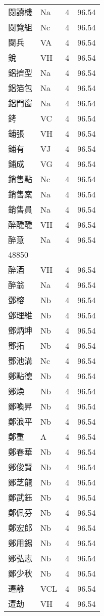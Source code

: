\documentclass[twocolumn]{book}
\begin{document}
\begin{supertabular}{llrr}
閱讀機 & Na & 4 &  96.54\\
閱覽組 & Nc & 4 &  96.54\\
閱兵 & VA & 4 &  96.54\\
銳 & VH & 4 &  96.54\\
鋁擠型 & Na & 4 &  96.54\\
鋁箔包 & Na & 4 &  96.54\\
鋁門窗 & Na & 4 &  96.54\\
銬 & VC & 4 &  96.54\\
鋪張 & VH & 4 &  96.54\\
鋪有 & VJ & 4 &  96.54\\
鋪成 & VG & 4 &  96.54\\
銷售點 & Nc & 4 &  96.54\\
銷售案 & Na & 4 &  96.54\\
銷售員 & Na & 4 &  96.54\\
醉醺醺 & VH & 4 &  96.54\\
醉意 & Na & 4 &  96.54\\
48850\\
醉酒 & VH & 4 &  96.54\\
醉翁 & Na & 4 &  96.54\\
鄧榕 & Nb & 4 &  96.54\\
鄧理維 & Nb & 4 &  96.54\\
鄧炳坤 & Nb & 4 &  96.54\\
鄧拓 & Nb & 4 &  96.54\\
鄧池溝 & Nc & 4 &  96.54\\
鄭點德 & Nb & 4 &  96.54\\
鄭煥 & Nb & 4 &  96.54\\
鄭喚昇 & Nb & 4 &  96.54\\
鄭浪平 & Nb & 4 &  96.54\\
鄭重 & A & 4 &  96.54\\
鄭春華 & Nb & 4 &  96.54\\
鄭俊賢 & Nb & 4 &  96.54\\
鄭芝龍 & Nb & 4 &  96.54\\
鄭武鈺 & Nb & 4 &  96.54\\
鄭佩芬 & Nb & 4 &  96.54\\
鄭宏郎 & Nb & 4 &  96.54\\
鄭用錫 & Nb & 4 &  96.54\\
鄭弘志 & Nb & 4 &  96.54\\
鄭少秋 & Nb & 4 &  96.54\\
遷離 & VCL & 4 &  96.54\\
遭劫 & VH & 4 &  96.54\\

\end{supertabular}
\end{document}
